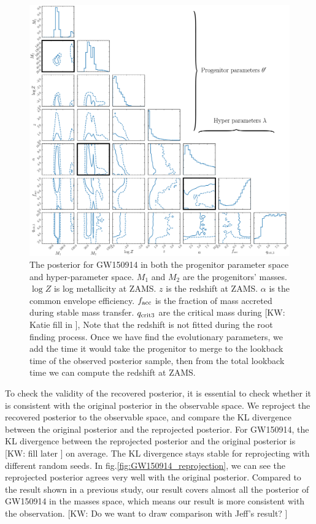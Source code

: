 \documentclass[twocolumn]{aastex631}
\newcommand{\kw}[1]{{\color{rb4}[KW: #1 ]}}
\begin{document}
\begin{figure}[h]
\includegraphics[width=\textwidth]{static/GW150914_corner_zoomed_annotated.pdf}
\caption{The posterior for GW150914 in both the progenitor parameter space and hyper-parameter space.
$M_1$ and $M_2$ are the progenitors' masses. $\log{Z}$ is log metallicity at ZAMS.
$z$ is the redshift at ZAMS. 
$\alpha$ is the common envelope efficiency.
$f_{\rm acc}$ is the fraction of mass accreted during stable mass transfer.
$q_{\rm crit 3}$ are the critical mass during \kw{Katie fill in},
Note that the redshift is not fitted during the root finding process.
Once we have find the evolutionary parameters, we add the time it would take the progenitor to merge to the lookback time of the observed posterior sample,
then from the total lookback time we can compute the redshift at ZAMS.
}
\label{fig:GW150914_posterior}
\end{figure}

To check the validity of the recovered posterior, it is essential to check whether it is consistent with the original posterior in the observable space.
We reproject the recovered posterior to the observable space, and compare the KL divergence between the original posterior and the reprojected posterior.
For GW150914, the KL divergence between the reprojected posterior and the original posterior is \kw{fill later} on average.
The KL divergence stays stable for reprojecting with different random seeds.
In fig.\ref{fig:GW150914_reprojection}, we can see the reprojected posterior agrees very well with the original posterior.
Compared to the result shown in a previous study, our result covers almost all the posterior of GW150914 in the masses space,
which means our result is more consistent with the observation.
\kw{Do we want to draw comparison with Jeff's result?}
\end{document}
